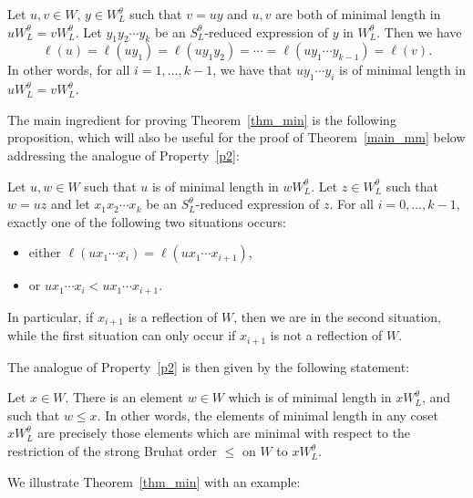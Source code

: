 \begin{theorem}\label{thm_min}
Let $u,v\in W$, $y\in W_L^\theta$ such that $v=uy$ and $u,v$ are both of minimal length in $u W_L^\theta= v W_L^\theta$. Let $y_1 y_2 \cdots y_k$ be an $S_L^\theta$-reduced expression of $y$ in $W_L^\theta$. Then we have $$\ell(u)=\ell(uy_1)=\ell(uy_1 y_2)=\cdots =\ell(u y_1 \cdots y_{k-1})=\ell(v).$$
In other words, for all $i=1, \dots, k-1$, we have that $u y_1 \cdots y_i$ is of minimal length in $uW_L^\theta=v W_L^\theta$.  
\end{theorem}    



The main ingredient for proving Theorem~\ref{thm_min} is the following proposition, which will also be useful for the proof of Theorem~\ref{main_mm} below addressing the analogue of Property~\ref{p2}: 

\begin{prop}\label{prop_esc}
Let $u, w\in W$ such that $u$ is of minimal length in $w W_L^\theta$. Let $z\in W_L^\theta$ such that $w=uz$ and let $x_1 x_2 \cdots x_k$ be an $S_L^\theta$-reduced expression of $z$. For all $i=0, \dots, k-1$, exactly one of the following two situations occurs:
\begin{itemize}
	\item either $\ell(u x_1 \cdots x_i)=\ell(u x_1 \cdots x_{i+1})$, 
	\item or $u x_1 \cdots x_i < u x_1 \cdots x_{i+1}$.
\end{itemize}
In particular, if $x_{i+1}$ is a reflection of $W$, then we are in the second situation, while the first situation can only occur if $x_{i+1}$ is not a reflection of $W$. 
\end{prop}

The analogue of Property~\ref{p2} is then given by the following statement:

\begin{theorem}\label{main_mm}
Let $x\in W$. There is an element $w\in W$ which is of minimal length in $x W_L^\theta$, and such that $w \leq x$. In other words, the elements of minimal length in any coset $x W_L^\theta$ are precisely those elements which are minimal with respect to the restriction of the strong Bruhat order $\leq$ on $W$ to $x W_L^\theta$. 
\end{theorem}

We illustrate Theorem~\ref{thm_min} with an example:

